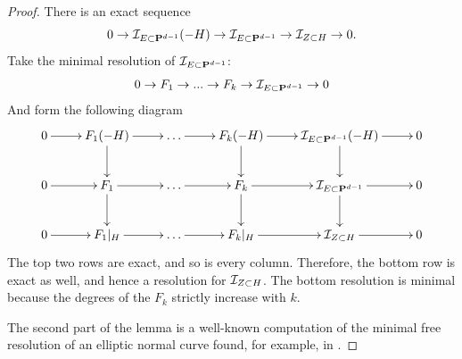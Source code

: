 \documentclass[11pt, two side, letterpaper, final]{amsart}
\renewcommand{\P}{{\bf P}}
\begin{document}
\begin{proof}
There is an exact sequence
\[
	0 \to \sh{I}_{E \subset \P^{d-1}}(-H) \to \sh{I}_{E \subset \P^{d-1}} \to \sh{I}_{Z \subset H} \to 0.
\]
Take the minimal resolution of $\sh{I}_{E \subset \P^{d-1}}$:
\[
	0 \to  F_1 \to ... \to F_{k} \to \sh{I}_{E \subset \P^{d-1}} \to 0
\]
And form the following diagram
\[
\xymatrix{
0\ar[r] & F_1(-H)\ar[r] \ar[d] & \ldots\ar[r] & F_k(-H)\ar[r]\ar[d] & \sh{I}_{E \subset \P^{d-1}}(-H)\ar[d]\ar[r] & 0 \\
0\ar[r] & F_1\ar[r] \ar[d] & \ldots\ar[r] & F_k\ar[r]\ar[d] & \sh{I}_{E \subset \P^{d-1}}\ar[d] \ar[r] & 0\\
0\ar[r] & F_1|_H\ar[r]  & \ldots\ar[r] & F_k|_H\ar[r] & \sh{I}_{Z \subset H} \ar[r] & 0\\
}
\]
The top two rows are exact, and so is every column. Therefore, the bottom row is exact as well, and hence a resolution
for ${\mathcal I}_{Z \subset H}$. The bottom resolution is minimal because the degrees of the $F_{k}$ strictly increase with $k$.  

The second part of the lemma is a well-known computation of the minimal free resolution of an elliptic normal curve found, for example, in \cite{eisenbud_commutative_????}.
\end{proof}
\end{document}

